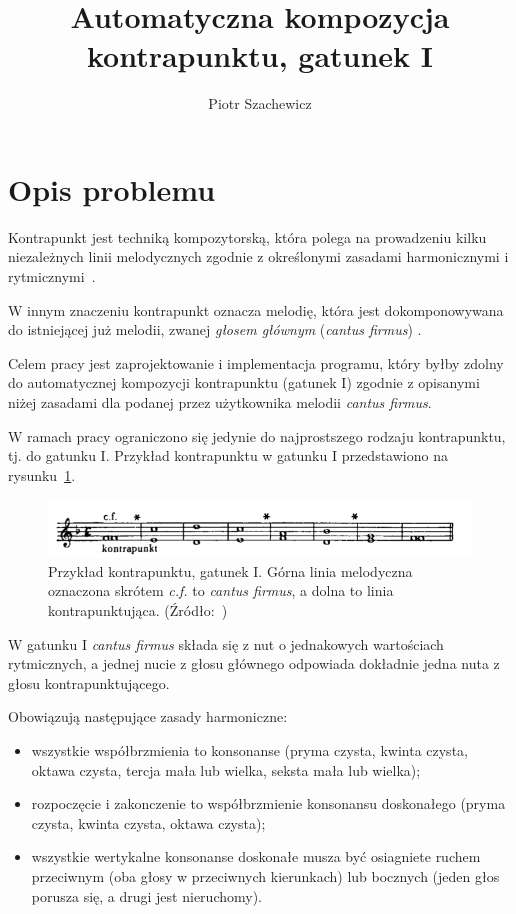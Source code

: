\documentclass{article}
\title{Automatyczna kompozycja kontrapunktu, gatunek I}
\author{Piotr Szachewicz}
\begin{document}
\maketitle

\section{Opis problemu}

Kontrapunkt jest techniką kompozytorską, która polega na prowadzeniu kilku niezależnych linii melodycznych zgodnie z określonymi zasadami harmonicznymi i rytmicznymi~\cite{wikiCounterpoint}.

W innym znaczeniu kontrapunkt oznacza melodię, która jest dokomponowywana do istniejącej już melodii, zwanej \emph{głosem głównym} (\emph{cantus firmus}) \cite{Sikorski}.

Celem pracy jest zaprojektowanie i implementacja programu, który byłby zdolny do automatycznej kompozycji kontrapunktu (gatunek I) zgodnie z opisanymi niżej zasadami dla podanej przez użytkownika melodii \emph{cantus firmus}.

W ramach pracy ograniczono się jedynie do najprostszego rodzaju kontrapunktu, tj. do gatunku I. Przykład kontrapunktu w gatunku I przedstawiono na rysunku~\ref{fig:kontrapunkt_przyklad_gawlas}.

\begin{figure}[htb]
\centering
\includegraphics[width=1.0\textwidth]{images/kontrapunkt_przyklad_gawlas.png}
\caption{Przykład kontrapunktu, gatunek I. Górna linia melodyczna oznaczona skrótem \emph{c.f.} to \emph{cantus firmus}, a dolna to linia kontrapunktująca. (Źródło:~\cite{gawlas})}
\label{fig:kontrapunkt_przyklad_gawlas}
\end{figure}

W gatunku I \emph{cantus firmus} składa się z nut o jednakowych wartościach rytmicznych, a jednej nucie z głosu głównego odpowiada dokładnie jedna nuta z głosu kontrapunktującego.

Obowiązują następujące zasady harmoniczne:

\begin{itemize}
\item wszystkie współbrzmienia to konsonanse (pryma czysta, kwinta czysta, oktawa czysta, tercja mała lub wielka, seksta mała lub wielka);
\item rozpoczęcie i zakonczenie to współbrzmienie konsonansu doskonałego (pryma czysta, kwinta czysta, oktawa czysta);
\item wszystkie wertykalne konsonanse doskonałe musza być osiagniete ruchem przeciwnym (oba głosy w przeciwnych kierunkach) lub bocznych (jeden głos porusza się, a drugi jest nieruchomy).
\end{itemize}
\end{document}
